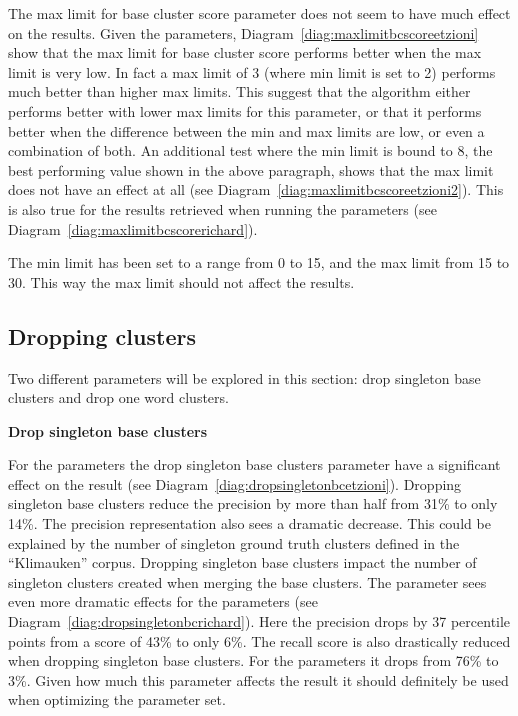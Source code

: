 The max limit for base cluster score parameter does not seem to have much effect on the results. Given the \citeauthor{Oren1998} parameters, Diagram~\ref{diag:maxlimitbcscoreetzioni} show that the max limit for base cluster score performs better when the max limit is very low. In fact a max limit of 3 (where min limit is set to 2) performs much better than higher max limits. This suggest that the algorithm either performs better with lower max limits for this parameter, or that it performs better when the difference between the min and max limits are low, or even a combination of both. An additional test where the min limit is bound to 8, the best performing value shown in the above paragraph, shows that the max limit does not have an effect at all (see Diagram~\ref{diag:maxlimitbcscoreetzioni2}). This is also true for the results retrieved when running the \cite{Moe2013} parameters (see Diagram~\ref{diag:maxlimitbcscorerichard}).

The min limit has been set to a range from 0 to 15, and the max limit from 15 to 30. This way the max limit should not affect the results.

\subsection{Dropping clusters}
Two different parameters will be explored in this section: drop singleton base clusters and drop one word clusters.

\textbf{Drop singleton base clusters}

For the \citeauthor{Oren1998} parameters the drop singleton base clusters parameter have a significant effect on the result (see Diagram~\ref{diag:dropsingletonbcetzioni}). Dropping singleton base clusters reduce the precision by more than half from 31\% to only 14\%. The precision representation also sees a dramatic decrease. This could be explained by the number of singleton ground truth clusters defined in the ``Klimauken'' corpus. Dropping singleton base clusters impact the number of singleton clusters created when merging the base clusters. The parameter sees even more dramatic effects for the \citeauthor{Moe2013} parameters (see Diagram~\ref{diag:dropsingletonbcrichard}). Here the precision drops by 37 percentile points from a score of 43\% to only 6\%. The recall score is also drastically reduced when dropping singleton base clusters. For the \citeauthor{Moe2013} parameters it drops from 76\% to 3\%. Given how much this parameter affects the result it should definitely be used when optimizing the parameter set.


